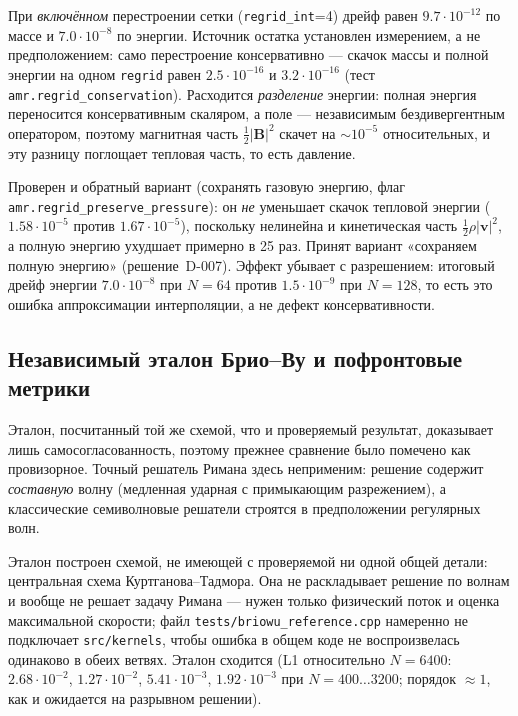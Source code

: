 \documentclass[12pt,a4paper]{article}
\newcommand{\B}{\mathbf{B}}
\newcommand{\vv}{\mathbf{v}}
\newcommand{\code}[1]{\texttt{#1}}
\begin{document}
\medskip
При \emph{включённом} перестроении сетки (\code{regrid\_int}=4) дрейф равен
$9.7\!\cdot\!10^{-12}$ по массе и $7.0\!\cdot\!10^{-8}$ по энергии. Источник
остатка установлен измерением, а не предположением: само перестроение
консервативно --- скачок массы и полной энергии на одном \code{regrid} равен
$2.5\!\cdot\!10^{-16}$ и $3.2\!\cdot\!10^{-16}$ (тест
\code{amr.regrid\_conservation}). Расходится \emph{разделение} энергии:
полная энергия переносится консервативным скаляром, а поле --- независимым
бездивергентным оператором, поэтому магнитная часть $\tfrac12|\B|^2$ скачет на
$\sim\!10^{-5}$ относительных, и эту разницу поглощает тепловая часть, то есть
давление.

Проверен и обратный вариант (сохранять газовую энергию, флаг
\code{amr.regrid\_preserve\_pressure}): он \emph{не} уменьшает скачок тепловой
энергии ($1.58\!\cdot\!10^{-5}$ против $1.67\!\cdot\!10^{-5}$), поскольку
нелинейна и кинетическая часть $\tfrac12\rho|\vv|^2$, а полную энергию ухудшает
примерно в 25 раз. Принят вариант «сохраняем полную энергию» (решение~D-007).
Эффект убывает с разрешением: итоговый дрейф энергии $7.0\!\cdot\!10^{-8}$ при
$N=64$ против $1.5\!\cdot\!10^{-9}$ при $N=128$, то есть это ошибка
аппроксимации интерполяции, а не дефект консервативности.

\subsection{Независимый эталон Брио--Ву и пофронтовые метрики}
\label{sec:res-briowu-t06}

Эталон, посчитанный той же схемой, что и проверяемый результат, доказывает лишь
самосогласованность, поэтому прежнее сравнение было помечено как провизорное.
Точный решатель Римана здесь неприменим: решение содержит \emph{составную} волну
(медленная ударная с примыкающим разрежением), а классические семиволновые
решатели строятся в предположении регулярных волн.

Эталон построен схемой, не имеющей с проверяемой ни одной общей детали:
центральная схема Куртганова--Тадмора. Она не раскладывает решение по волнам и
вообще не решает задачу Римана --- нужен только физический поток и оценка
максимальной скорости; файл \code{tests/briowu\_reference.cpp} намеренно не
подключает \code{src/kernels}, чтобы ошибка в общем коде не воспроизвелась
одинаково в обеих ветвях. Эталон сходится (L1 относительно $N=6400$:
$2.68\!\cdot\!10^{-2}$, $1.27\!\cdot\!10^{-2}$, $5.41\!\cdot\!10^{-3}$,
$1.92\!\cdot\!10^{-3}$ при $N=400\ldots3200$; порядок $\approx1$, как и
ожидается на разрывном решении).
\end{document}

